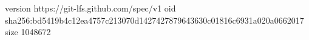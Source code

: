 version https://git-lfs.github.com/spec/v1
oid sha256:bd5419b4c12ea4757c213070d1427427879643630c01816c6931a020a0662017
size 1048672
